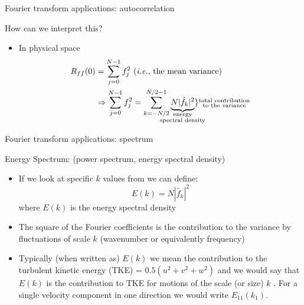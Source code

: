 \begin{frame}{Fourier transform applications: autocorrelation}

How can we interpret this?
\begin{itemize}
	\item In physical space
	\begin{align*}
	R_{ff}(0) &= \sum^{N-1}_{j=0} f_j^2\ (\text{\emph{i.e.}, the mean variance})\\
	&\Rightarrow \sum^{N-1}_{j=0} f_j^2 = \sum_{k=-N/2}^{N/2-1} \underbrace{N|\hat f_k|^2}_{\mathclap{\substack{\text{energy}\\\text{spectral density}} }}\}{\substack{\text{total contribution}\\\text{to the variance}}}
	\end{align*}
\end{itemize}

\end{frame}


\begin{frame}{Fourier transform applications: spectrum}

Energy Spectrum: (power spectrum, energy spectral density)
\begin{itemize}
	\item If we look at specific $k$ values from we can define: $$E(k) = N|\hat f_k|^2$$ where $E(k)$ is the energy spectral density
	\item  The square of the Fourier coefficients is the contribution to the variance by fluctuations of scale $k$ (wavenumber or equivalently frequency)
	\item Typically (when written as) $E(k)$ we mean the contribution to the turbulent kinetic energy (TKE) = $0.5(u^2+v^2+w^2)$ and we would say that $E(k)$ is the contribution to TKE for motions of the scale (or size) $k$ . For a single velocity component in one direction we would write $E_{11}(k_1)$.
\end{itemize}

\end{frame}

